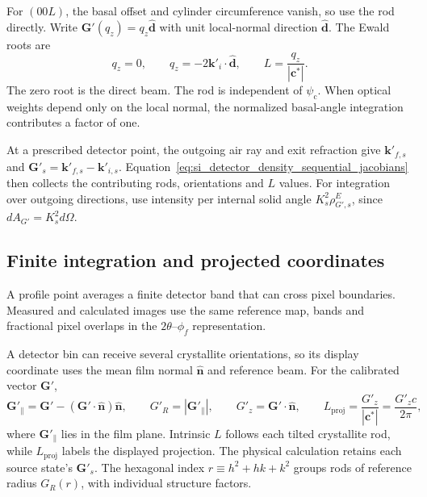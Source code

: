 For $(00L)$, the basal offset and cylinder circumference vanish, so use the rod directly. Write $\mathbf G'(q_z)=q_z\hat{\mathbf d}$ with unit local-normal direction $\hat{\mathbf d}$. The Ewald roots are
\begin{equation}
q_z=0,
\qquad q_z=-2\mathbf k'_i\cdot\hat{\mathbf d},
\qquad L=\frac{q_z}{|\mathbf c^*|}.
\label{eq:si_axial_ewald_roots}
\end{equation}
The zero root is the direct beam. The rod is independent of $\psi_{\mathrm c}$. When optical weights depend only on the local normal, the normalized basal-angle integration contributes a factor of one.

At a prescribed detector point, the outgoing air ray and exit refraction give $\mathbf k'_{f,s}$ and $\mathbf G'_s=\mathbf k'_{f,s}-\mathbf k'_{i,s}$. Equation~\eqref{eq:si_detector_density_sequential_jacobians} then collects the contributing rods, orientations and $L$ values. For integration over outgoing directions, use intensity per internal solid angle $K_s^2\rho_{G',s}^E$, since $dA_{G'}=K_s^2d\Omega$.

\subsection{Finite integration and projected coordinates}
\label{subsec:si_projection_uncertainty}

A profile point averages a finite detector band that can cross pixel boundaries. Measured and calculated images use the same reference map, bands and fractional pixel overlaps in the $2\theta$--$\phi_f$ representation.\cite{Ashiotis2015}

A detector bin can receive several crystallite orientations, so its display coordinate uses the mean film normal $\hat{\mathbf n}$ and reference beam. For the calibrated vector $\mathbf G'$,
\begin{equation}
{\mathbf G'}_{\parallel}
={\mathbf G'}-({\mathbf G'}\cdot\hat{\mathbf n})\hat{\mathbf n},
\qquad
{G'_R}=|{\mathbf G'}_{\parallel}|,
\qquad
{G'_z}={\mathbf G'}\cdot \hat{\mathbf n},
\qquad
L_{\mathrm{proj}}=\frac{{G'_z}}{|\mathbf c^{*}|}=\frac{{G'_z} c}{2\pi},
\end{equation}
where ${\mathbf G'}_{\parallel}$ lies in the film plane. Intrinsic $L$ follows each tilted crystallite rod, while $L_{\mathrm{proj}}$ labels the displayed projection. The physical calculation retains each source state's $\mathbf G'_s$. The hexagonal index $r\equiv h^2+hk+k^2$ groups rods of reference radius $G_R(r)$, with individual structure factors.

